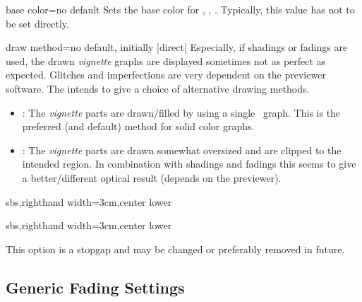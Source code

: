 \begin{vigTcbKey}[][doc new=2016-04-22]{base color}{=}{no default}
  Sets the base color for ,
  , .
  Typically, this value has not to be set directly.
\end{vigTcbKey}


\clearpage
\begin{vigTcbKey}[][doc new=2016-04-22]{draw method}{=\textbar{}}{no default, initially |direct|}
  Especially, if shadings or fadings are used, the drawn \emph{vignette}
  graphs are displayed sometimes not as perfect as expected. Glitches and
  imperfections are very dependent on the previewer software.
  The  intends to give a choice of alternative
  drawing methods.
  \begin{itemize}
  \item{}: The \emph{vignette} parts are drawn/filled
    by using a single \tikzname\ graph. This is the preferred (and default)
    method for solid color graphs.
  \item{}: The \emph{vignette} parts are drawn somewhat
    oversized and are clipped to the intended region.
    In combination with shadings and fadings this seems to give a
    better/different optical result (depends on the previewer).
  \end{itemize}
\begin{dispExample*}{sbs,righthand width=3cm,center lower}
\end{dispExample*}
\begin{dispExample*}{sbs,righthand width=3cm,center lower}
\end{dispExample*}

\begin{marker}
This option is a stopgap and may be changed or preferably removed in
future.
\end{marker}
\end{vigTcbKey}



\subsection{Generic Fading Settings}\label{subsec:vignettefading}

